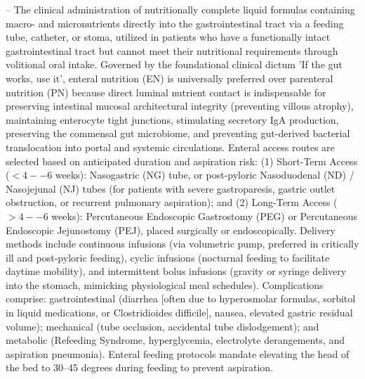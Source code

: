 -- The clinical administration of nutritionally complete liquid formulas containing macro- and micronutrients directly into the gastrointestinal tract via a feeding tube, catheter, or stoma, utilized in patients who have a functionally intact gastrointestinal tract but cannot meet their nutritional requirements through volitional oral intake. Governed by the foundational clinical dictum 'If the gut works, use it', enteral nutrition (EN) is universally preferred over parenteral nutrition (PN) because direct luminal nutrient contact is indispensable for preserving intestinal mucosal architectural integrity (preventing villous atrophy), maintaining enterocyte tight junctions, stimulating secretory IgA production, preserving the commensal gut microbiome, and preventing gut-derived bacterial translocation into portal and systemic circulations. Enteral access routes are selected based on anticipated duration and aspiration risk: (1) Short-Term Access ($<4--6$ weeks): Nasogastric (NG) tube, or post-pyloric Nasoduodenal (ND) / Nasojejunal (NJ) tubes (for patients with severe gastroparesis, gastric outlet obstruction, or recurrent pulmonary aspiration); and (2) Long-Term Access ($>4--6$ weeks): Percutaneous Endoscopic Gastrostomy (PEG) or Percutaneous Endoscopic Jejunostomy (PEJ), placed surgically or endoscopically. Delivery methods include continuous infusions (via volumetric pump, preferred in critically ill and post-pyloric feeding), cyclic infusions (nocturnal feeding to facilitate daytime mobility), and intermittent bolus infusions (gravity or syringe delivery into the stomach, mimicking physiological meal schedules). Complications comprise: gastrointestinal (diarrhea [often due to hyperosmolar formulas, sorbitol in liquid medications, or Clostridioides difficile], nausea, elevated gastric residual volume); mechanical (tube occlusion, accidental tube dislodgement); and metabolic (Refeeding Syndrome, hyperglycemia, electrolyte derangements, and aspiration pneumonia). Enteral feeding protocols mandate elevating the head of the bed to 30--45 degrees during feeding to prevent aspiration.

